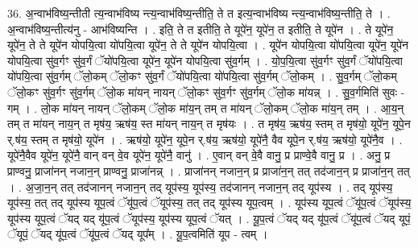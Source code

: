 \documentclass[17pt]{extarticle}
\begin{document}
36. अ॒न्वाभ॑विष्य॒न्तीती त्य॒न्वाभ॑विष्य न्त्य॒न्वाभ॑विष्य॒न्तीति॒ ते त इत्य॒न्वाभ॑विष्य न्त्य॒न्वाभ॑विष्य॒न्तीति॒ ते । . अ॒न्वाभ॑विष्य॒न्तीत्य॑नु - आभ॑विष्यन्ति । . इति॒ ते त इतीति॒ ते यूपे॑न॒ यूपे॑न॒ त इतीति॒ ते यूपे॑न । . ते यूपे॑न॒ यूपे॑न॒ ते ते यूपे॑न योपयि॒त्वा यो॑पयि॒त्वा यूपे॑न॒ ते ते यूपे॑न योपयि॒त्वा । . यूपे॑न योपयि॒त्वा यो॑पयि॒त्वा यूपे॑न॒ यूपे॑न योपयि॒त्वा सु॑व॒र्गꣳ सु॑व॒र्गं ॅयो॑पयि॒त्वा यूपे॑न॒ यूपे॑न योपयि॒त्वा सु॑व॒र्गम् । . यो॒प॒यि॒त्वा सु॑व॒र्गꣳ सु॑व॒र्गं ॅयो॑पयि॒त्वा यो॑पयि॒त्वा सु॑व॒र्गम् ॅलो॒कम् ॅलो॒कꣳ सु॑व॒र्गं ॅयो॑पयि॒त्वा यो॑पयि॒त्वा सु॑व॒र्गम् ॅलो॒कम् । . सु॒व॒र्गम् ॅलो॒कम् ॅलो॒कꣳ सु॑व॒र्गꣳ सु॑व॒र्गम् ॅलो॒क मा॑यन् नायन् ॅलो॒कꣳ सु॑व॒र्गꣳ सु॑व॒र्गम् ॅलो॒क मा॑यन्न् । . सु॒व॒र्गमिति॑ सुवः - गम् । . लो॒क मा॑यन् नायन् ॅलो॒कम् ॅलो॒क मा॑य॒न् तम् त मा॑यन् ॅलो॒कम् ॅलो॒क मा॑य॒न् तम् । . आ॒य॒न् तम् त मा॑यन् नाय॒न् त मृष॑य॒ ऋष॑य॒ स्त मा॑यन् नाय॒न् त मृष॑यः । . त मृष॑य॒ ऋष॑य॒ स्तम् त मृष॑यो॒ यूपे॑न॒ यूपे॒न र्.ष॑य॒ स्तम् त मृष॑यो॒ यूपे॑न । . ऋष॑यो॒ यूपे॑न॒ यूपे॒न र्.ष॑य॒ ऋष॑यो॒ यूपे॑नै॒ वैव यूपे॒न र्.ष॑य॒ ऋष॑यो॒ यूपे॑नै॒व । . यूपे॑नै॒वैव यूपे॑न॒ यूपे॑नै॒ वान् वन् वे॒व यूपे॑न॒ यूपे॑नै॒ वानु॑ । . ए॒वान् वन् वे॒वै वानु॒ प्र प्राण्वे॒वै वानु॒ प्र । . अनु॒ प्र प्राण्वनु॒ प्राजा॑नन् नजान॒न् प्राण्वनु॒ प्राजा॑नन्न् । . प्राजा॑नन् नजान॒न् प्र प्राजा॑न॒न् तत् तद॑जान॒न् प्र प्राजा॑न॒न् तत् । . अ॒जा॒न॒न् तत् तद॑जानन् नजान॒न् तद् यूप॑स्य॒ यूप॑स्य॒ तद॑जानन् नजान॒न् तद् यूप॑स्य । . तद् यूप॑स्य॒ यूप॑स्य॒ तत् तद् यूप॑स्य यूप॒त्वं ॅयू॑प॒त्वं ॅयूप॑स्य॒ तत् तद् यूप॑स्य यूप॒त्वम् । . यूप॑स्य यूप॒त्वं ॅयू॑प॒त्वं ॅयूप॑स्य॒ यूप॑स्य यूप॒त्वं ॅयद् यद् यू॑प॒त्वं ॅयूप॑स्य॒ यूप॑स्य यूप॒त्वं ॅयत् । . यू॒प॒त्वं ॅयद् यद् यू॑प॒त्वं ॅयू॑प॒त्वं ॅयद् यूपं॒ ॅयूपं॒ ॅयद् यू॑प॒त्वं ॅयू॑प॒त्वं ॅयद् यूप᳚म् । . यू॒प॒त्वमिति॑ यूप - त्वम् । \newline
\pagebreak
{}
\end{document}
